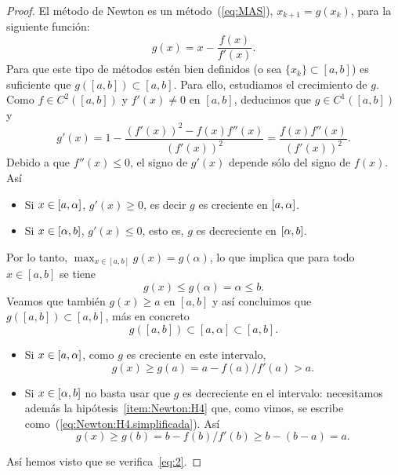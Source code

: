 \begin{proof}
  El método de Newton es un
  método~(\ref{eq:MAS}), $x_{k+1}=g(x_k)$, para la siguiente función:
  \begin{equation*}
    g(x)=x-\frac{f(x)}{f'(x)}.
  \end{equation*}
  Para que este tipo de métodos estén bien definidos (o sea
  $\{x_k\}\subset [a,b]$) es suficiente que $g([a,b])\subset [a,b]$.
  Para ello, estudiamos el crecimiento de $g$.
  Como $f\in C^2([a,b])$ y $f'(x)\neq 0$ en
  $[a,b]$, deducimos que $g\in C^1([a,b])$ y
  \begin{equation}
    g'(x)
    = 1-\frac{\left(f'(x)\right)^2-f(x)f''(x)}{\left(f'(x)\right)^2}
    = \frac{f(x)f''(x)}{\left(f'(x)\right)^2}.
    \label{eq:Newton.g'(x)}    
  \end{equation}
  Debido a que $f''(x)\le 0$, el signo de $g'(x)$ depende sólo del
  signo de $f(x)$. Así
  \begin{itemize}%
  \item Si $x\in [a,\alpha]$, $g'(x)\ge 0$, es decir $g$ es creciente en
    $[a,\alpha]$.
  \item Si $x\in [\alpha,b]$, $g'(x)\le 0$, esto es, $g$ es decreciente
    en $[\alpha,b]$.
  \end{itemize}

  Por lo tanto, $\max_{x\in [a,b]} g(x)=g(\alpha)$, lo que implica que
  para todo
  $x\in [a,b]$ se tiene 
  $$
  g(x)\le g(\alpha)=\alpha \le b.
  $$
  Veamos que también $g(x)\ge a$ en $[a,b]$ y así concluimos que
  $g([a,b]) \subset [a,b]$, más en concreto 
  \begin{equation}
    g([a,b])\subset [a,\alpha] \subset [a,b].\label{eq:2}    
  \end{equation}

  \begin{itemize}
  \item Si $x\in [a,\alpha]$, como $g$ es creciente en este intervalo,
    $$g(x)\ge  g(a) = a-f(a)/f'(a) > a.$$
  \item Si $x\in [\alpha,b]$ no basta usar que $g$ es
    decreciente en el intervalo: necesitamos además la
    hipótesis~\ref{item:Newton:H4} que, como vimos, se escribe
    como~(\ref{eq:Newton:H4.simplificada}). Así
    $$g(x) \ge g(b)=b-f(b)/f'(b) \ge b-(b-a)=a.$$
  \end{itemize}
  Así hemos visto que se verifica~\eqref{eq:2}.


\end{proof}
